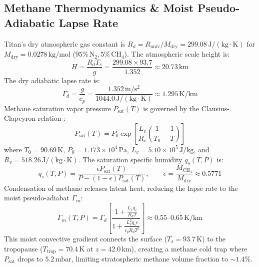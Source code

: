 \documentclass[11pt,a4paper]{article}
\begin{document}
\subsection{Methane Thermodynamics \& Moist Pseudo-Adiabatic Lapse Rate}
Titan's dry atmospheric gas constant is $R_d = R_{\mathrm{univ}} / M_{\mathrm{dry}} = 299.08\,\mathrm{J/(kg\cdot K)}$ for $M_{\mathrm{dry}} = 0.0278\,\mathrm{kg/mol}$ ($95\%\,\mathrm{N}_2, 5\%\,\mathrm{CH}_4$). The atmospheric scale height is:
\begin{equation}
H = \frac{R_d T_s}{g} = \frac{299.08 \times 93.7}{1.352} \approx 20.73\,\mathrm{km}
\end{equation}
The dry adiabatic lapse rate is:
\begin{equation}
\Gamma_d = \frac{g}{c_p} = \frac{1.352\,\mathrm{m/s^2}}{1044.0\,\mathrm{J/(kg\cdot K)}} \approx 1.295\,\mathrm{K/km}
\end{equation}
Methane saturation vapor pressure $P_{\mathrm{sat}}(T)$ is governed by the Clausius-Clapeyron relation \cite{showman2006}:
\begin{equation}
P_{\mathrm{sat}}(T) = P_0 \exp\left[ \frac{L_v}{R_v}\left(\frac{1}{T_0} - \frac{1}{T}\right) \right]
\end{equation}
where $T_0 = 90.69\,\mathrm{K}$, $P_0 = 1.173 \times 10^4\,\mathrm{Pa}$, $L_v = 5.10 \times 10^5\,\mathrm{J/kg}$, and $R_v = 518.26\,\mathrm{J/(kg\cdot K)}$.
The saturation specific humidity $q_s(T, P)$ is:
\begin{equation}
q_s(T, P) = \frac{\epsilon P_{\mathrm{sat}}(T)}{P - (1 - \epsilon)P_{\mathrm{sat}}(T)}, \qquad \epsilon = \frac{M_{\mathrm{CH}_4}}{M_{\mathrm{dry}}} \approx 0.5771
\end{equation}
Condensation of methane releases latent heat, reducing the lapse rate to the moist pseudo-adiabat $\Gamma_m$:
\begin{equation}
\Gamma_m(T, P) = \Gamma_d \left[ \frac{1 + \frac{L_v q_s}{R_d T}}{1 + \frac{L_v^2 q_s \epsilon}{c_p R_d T^2}} \right] \approx 0.55\text{--}0.65\,\mathrm{K/km}
\end{equation}
This moist convective gradient connects the surface ($T_s = 93.7\,\mathrm{K}$) to the tropopause ($T_{\mathrm{trop}} = 70.4\,\mathrm{K}$ at $z = 42.0\,\mathrm{km}$), creating a methane cold trap where $P_{\mathrm{sat}}$ drops to $5.2\,\mathrm{mbar}$, limiting stratospheric methane volume fraction to $\sim 1.4\%$.
\end{document}
